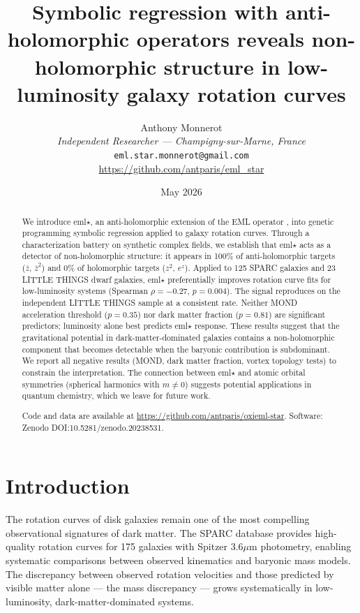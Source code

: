 \documentclass[12pt,a4paper]{article}
\title{Symbolic regression with anti-holomorphic operators reveals non-holomorphic structure in low-luminosity galaxy rotation curves}
\author{Anthony Monnerot\\
\textit{Independent Researcher --- Champigny-sur-Marne, France}\\
\texttt{eml.star.monnerot@gmail.com}\\
\url{https://github.com/antparis/eml_star}}
\date{May 2026}
\begin{document}
\maketitle

\begin{abstract}
We introduce eml$\star$, an anti-holomorphic extension of the EML operator \citep{Odrzywolek2026}, into genetic programming symbolic regression applied to galaxy rotation curves. Through a characterization battery on synthetic complex fields, we establish that eml$\star$ acts as a detector of non-holomorphic structure: it appears in 100\% of anti-holomorphic targets ($\overline{z}$, $\overline{z}^2$) and 0\% of holomorphic targets ($z^2$, $e^z$). Applied to 125 SPARC galaxies and 23 LITTLE THINGS dwarf galaxies, eml$\star$ preferentially improves rotation curve fits for low-luminosity systems (Spearman $\rho = -0.27$, $p = 0.004$). The signal reproduces on the independent LITTLE THINGS sample at a consistent rate. Neither MOND acceleration threshold ($p = 0.35$) nor dark matter fraction ($p = 0.81$) are significant predictors; luminosity alone best predicts eml$\star$ response. These results suggest that the gravitational potential in dark-matter-dominated galaxies contains a non-holomorphic component that becomes detectable when the baryonic contribution is subdominant. We report all negative results (MOND, dark matter fraction, vortex topology tests) to constrain the interpretation. The connection between eml$\star$ and atomic orbital symmetries (spherical harmonics with $m \neq 0$) suggests potential applications in quantum chemistry, which we leave for future work.

Code and data are available at \url{https://github.com/antparis/oxieml-star}. Software: Zenodo DOI:10.5281/zenodo.20238531.
\end{abstract}

\section{Introduction}

The rotation curves of disk galaxies remain one of the most compelling observational signatures of dark matter. The SPARC database \citep{Lelli2016} provides high-quality rotation curves for 175 galaxies with Spitzer 3.6$\mu$m photometry, enabling systematic comparisons between observed kinematics and baryonic mass models. The discrepancy between observed rotation velocities and those predicted by visible matter alone --- the mass discrepancy --- grows systematically in low-luminosity, dark-matter-dominated systems.
\end{document}
